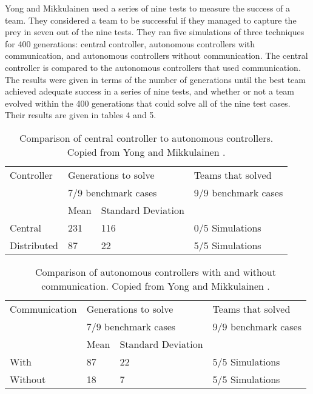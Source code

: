 \documentclass[12pt]{article} %
\begin{document}
Yong and Mikkulainen used a series of nine tests to measure the success of a team. They considered a team to be successful if they managed to capture the prey in seven out of the nine tests. They ran five simulations of three techniques for 400 generations: central controller, autonomous controllers with communication, and autonomous controllers without communication. The central controller is compared to the autonomous controllers that used communication. The results were given in terms of the number of generations until the best team achieved adequate success in a series of nine tests, and whether or not a team evolved within the 400 generations that could solve all of the nine test cases. Their results are given in tables 4 and 5.

\begin{table} \centering
    \begin{tabular}{|l|l|l|l|}
    \hline
    Controller & \multicolumn{2}{l|}{Generations to solve} & Teams that solved    \\
    ~             & \multicolumn{2}{l|}{7/9 benchmark cases} &  9/9 benchmark cases \\ \hline
    ~           & Mean                                            & Standard Deviation  & ~                                            \\ \hline
    Central     & 231                                             & 116 & 0/5 Simulations                              \\ \hline
    Distributed & 87                                              & 22  & 5/5 Simulations                              \\ \hline
    \end{tabular}
    \caption {Comparison of central controller to autonomous controllers. Copied from Yong and Mikkulainen \cite{Yong2001}.}
\end{table}

\begin{table} \centering
    \begin{tabular}{|l|l|l|l|}
    \hline
   Communication & \multicolumn{2}{l|}{Generations to solve} & Teams that solved    \\
    ~             & \multicolumn{2}{l|}{7/9 benchmark cases} &  9/9 benchmark cases \\ \hline
    ~             & Mean                                            & Standard Deviation & ~                                            \\ \hline
    With          & 87                                              & 22 & 5/5 Simulations                              \\ \hline
    Without       & 18                                              & 7  & 5/5 Simulations                              \\ \hline
    \end{tabular}
    \caption {Comparison of autonomous controllers with and without communication. Copied from Yong and Mikkulainen \cite{Yong2001}.}
\end{table}
\end{document}

